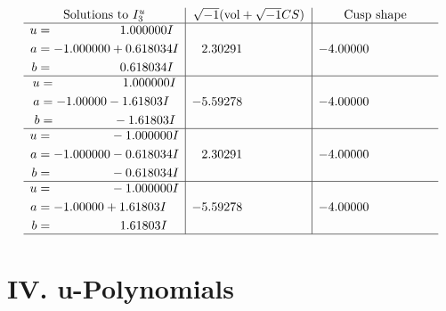 \documentclass[1p]{elsarticle_modified}
\theoremstyle{definition}
\newcommand{\I}{\sqrt{-1}}
\begin{document}
$$\begin{array}{c|c|c}  
\text{Solutions to }I^u_{3}& \I (\text{vol} + \sqrt{-1}CS) & \text{Cusp shape}\\
 \hline 
\begin{aligned}
u &= \phantom{-0.000000 -}1.000000 I \\
a &= -1.000000 + 0.618034 I \\
b &= \phantom{-0.000000 -}0.618034 I\end{aligned}
 & \phantom{-}2.30291\phantom{ +0.000000I} & -4.00000\phantom{ +0.000000I} \\ \hline\begin{aligned}
u &= \phantom{-0.000000 -}1.000000 I \\
a &= -1.00000 - 1.61803 I \\
b &= \phantom{-0.000000 } -1.61803 I\end{aligned}
 & -5.59278\phantom{ +0.000000I} & -4.00000\phantom{ +0.000000I} \\ \hline\begin{aligned}
u &= \phantom{-0.000000 } -1.000000 I \\
a &= -1.000000 - 0.618034 I \\
b &= \phantom{-0.000000 } -0.618034 I\end{aligned}
 & \phantom{-}2.30291\phantom{ +0.000000I} & -4.00000\phantom{ +0.000000I} \\ \hline\begin{aligned}
u &= \phantom{-0.000000 } -1.000000 I \\
a &= -1.00000 + 1.61803 I \\
b &= \phantom{-0.000000 -}1.61803 I\end{aligned}
 & -5.59278\phantom{ +0.000000I} & -4.00000\phantom{ +0.000000I}\\
 \hline 
 \end{array}$$\newpage
\newpage\renewcommand{\arraystretch}{1}
\centering \section*{ IV. u-Polynomials}
\end{document}
